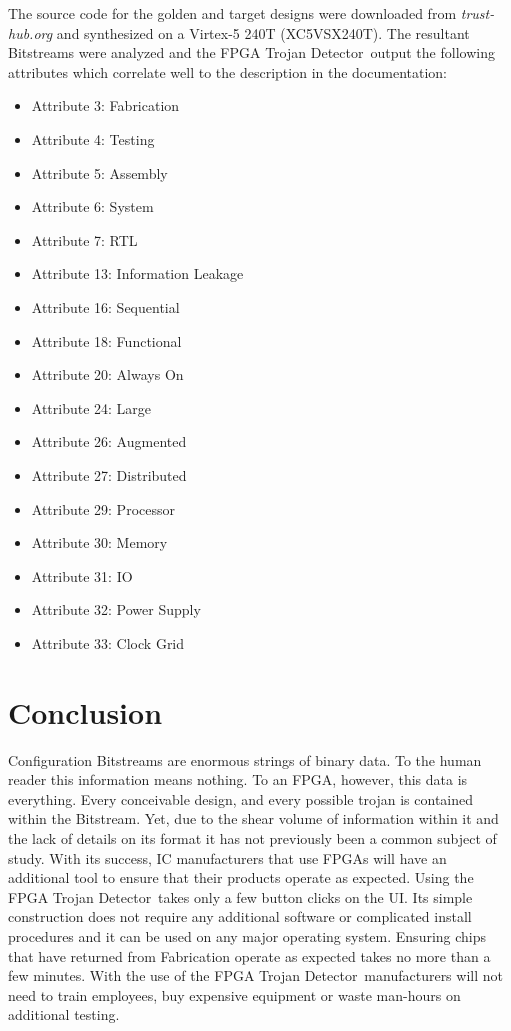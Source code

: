 \documentclass[conference]{IEEEtran}
\newcommand{\Name}{\acrshort{FPGA} Trojan Detector}
\newcommand{\NameNoPeriod}{\Name~}
\begin{document}
The source code for the \gls{golden} and \gls{target} designs were downloaded from \textit{trust-hub.org} and synthesized on a Virtex-5 240T  (XC5VSX240T).
The resultant \gls{Bitstream}s were analyzed and the \NameNoPeriod output the following attributes which correlate well to the description in the documentation:
\begin{itemize}
	\item Attribute 3: Fabrication
	\item Attribute 4: Testing
	\item Attribute 5: Assembly
	\item Attribute 6: System
	\item Attribute 7: RTL
	\item Attribute 13: Information Leakage
	\item Attribute 16: Sequential
	\item Attribute 18: Functional
	\item Attribute 20: Always On
	\item Attribute 24: Large
	\item Attribute 26: Augmented
	\item Attribute 27: Distributed
	\item Attribute 29: Processor
	\item Attribute 30: Memory
	\item Attribute 31: \acrshort{IO}
	\item Attribute 32: Power Supply
	\item Attribute 33: Clock Grid
\end{itemize}

\section{Conclusion} \label{sec:conclusion}
Configuration \gls{Bitstream}s are enormous strings of binary data.
To the human reader this information means nothing.
To an \acrshort{FPGA}, however, this data is everything.
Every conceivable design, and every possible trojan is contained within the \gls{Bitstream}.
Yet, due to the shear volume of information within it and the lack of details on its format it has not previously been a common subject of study.
With its success, \acrlong{IC} manufacturers that use \acrshort{FPGA}s will have an additional tool to ensure that their products operate as expected.
Using the \NameNoPeriod takes only a few button clicks on the \acrlong{UI}.
Its simple construction does not require any additional software or complicated install procedures and it can be used on any major operating system.
Ensuring chips that have returned from Fabrication operate as expected takes no more than a few minutes.
With the use of the \NameNoPeriod manufacturers will not need to train employees, buy expensive equipment or waste man-hours on additional testing.






%
%

\printbibliography
\end{document}
